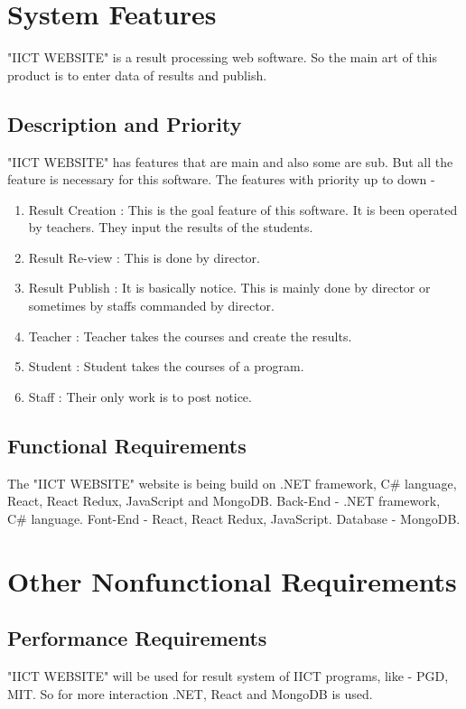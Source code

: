 \documentclass{scrreprt}
\begin{document}
    \chapter{System Features}
    "IICT WEBSITE" is a result processing web software. So the main art of this product is to enter data of results and publish. 
    
    \section{Description and Priority}
    "IICT WEBSITE" has features that are main and also some are sub. But all the feature is necessary for this software.
    \newline
    The features with priority up to down - 
    \begin{enumerate}
        \item Result Creation : This is the goal feature of this software. It is been operated by teachers. They input the results of the students.
        \item Result Re-view : This is done by director.
        \item Result Publish : It is basically notice. This is mainly done by director or sometimes by staffs commanded by director.
        \item Teacher : Teacher takes the courses and create the results.
        \item Student : Student takes the courses of a program.
        \item Staff : Their only work is to post notice.
    \end{enumerate}
    \section{Functional Requirements}
    The "IICT WEBSITE" website is being build on .NET framework, C\# language, React, React Redux, JavaScript and MongoDB.
    \newline
    Back-End - .NET framework, C\# language.
    \newline
    Font-End - React, React Redux, JavaScript.
    \newline
    Database -  MongoDB.
    
    
    \chapter{Other Nonfunctional Requirements}
    
    \section{Performance Requirements}
    "IICT WEBSITE" will be used for result system of IICT programs, like - PGD, MIT. So for more interaction .NET, React and MongoDB is used. 
    
\end{document}
